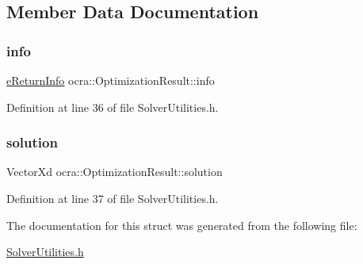 \subsection{Member Data Documentation}
\hypertarget{structocra_1_1OptimizationResult_ab422e9cee7b8996585676d61ca14499b}{}\label{structocra_1_1OptimizationResult_ab422e9cee7b8996585676d61ca14499b} 
\subsubsection{\texorpdfstring{info}{info}}
{\footnotesize\ttfamily \hyperlink{namespaceocra_aa1d873ac30cb0a0f79ba978745de294b}{e\+Return\+Info} ocra\+::\+Optimization\+Result\+::info}



Definition at line 36 of file Solver\+Utilities.\+h.

\hypertarget{structocra_1_1OptimizationResult_a5d0f76e8b3e5d517ba83a2ecd082f85b}{}\label{structocra_1_1OptimizationResult_a5d0f76e8b3e5d517ba83a2ecd082f85b} 
\subsubsection{\texorpdfstring{solution}{solution}}
{\footnotesize\ttfamily Vector\+Xd ocra\+::\+Optimization\+Result\+::solution}



Definition at line 37 of file Solver\+Utilities.\+h.



The documentation for this struct was generated from the following file\+:\begin{DoxyCompactItemize}
\item 
\hyperlink{SolverUtilities_8h}{Solver\+Utilities.\+h}\end{DoxyCompactItemize}
